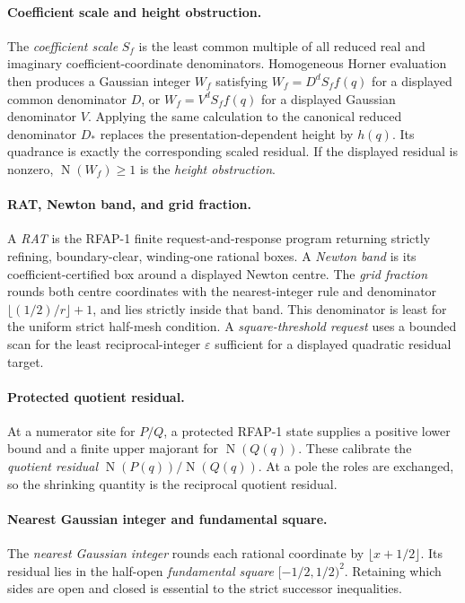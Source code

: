 \documentclass[11pt]{article}
\newcommand{\Norm}[1]{\operatorname{N}\!\left(#1\right)}
\newcommand{\eps}{\varepsilon}
\begin{document}
\paragraph{Coefficient scale and height obstruction.}
The \emph{coefficient scale} $S_f$ is the least common multiple of all
reduced real and imaginary coefficient-coordinate denominators.  Homogeneous
Horner evaluation then produces a Gaussian integer $W_f$ satisfying
$W_f=D^dS_ff(q)$ for a displayed common denominator $D$, or
$W_f=V^dS_ff(q)$ for a displayed Gaussian denominator $V$.  Applying the
same calculation to the canonical reduced denominator $D_*$ replaces the
presentation-dependent height by $h(q)$.  Its quadrance is exactly the
corresponding scaled residual.  If the displayed residual is nonzero,
$\Norm{W_f}\ge1$ is the \emph{height obstruction}.

\paragraph{RAT, Newton band, and grid fraction.}
A \emph{RAT} is the RFAP-1 finite request-and-response program returning
strictly refining, boundary-clear, winding-one rational boxes.  A
\emph{Newton band} is its coefficient-certified box around a displayed Newton
centre.  The \emph{grid fraction} rounds both centre coordinates with the
nearest-integer rule and denominator $\lfloor(1/2)/r\rfloor+1$, and lies
strictly inside that band.  This denominator is least for the uniform strict
half-mesh condition.  A \emph{square-threshold request} uses a bounded scan
for the least reciprocal-integer $\eps$ sufficient for a displayed quadratic
residual target.

\paragraph{Protected quotient residual.}
At a numerator site for $P/Q$, a protected RFAP-1 state supplies a positive
lower bound and a finite upper majorant for $\Norm{Q(q)}$.  These calibrate the
\emph{quotient residual} $\Norm{P(q)}/\Norm{Q(q)}$.  At a pole the roles are
exchanged, so the shrinking quantity is the reciprocal quotient residual.

\paragraph{Nearest Gaussian integer and fundamental square.}
The \emph{nearest Gaussian integer} rounds each rational coordinate by
$\lfloor x+1/2\rfloor$.  Its residual lies in the half-open
\emph{fundamental square} $[-1/2,1/2)^2$.  Retaining which sides are open and
closed is essential to the strict successor inequalities.
\end{document}
